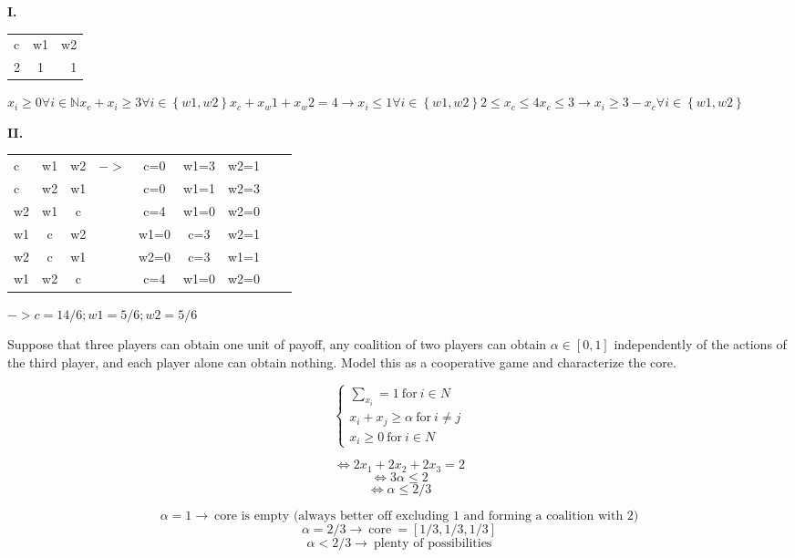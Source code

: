 \documentclass[../main.tex]{subfiles}
\begin{document}
\begin{solution}

\textbf{I.}

\begin{tabular}{ l | c |r }
  c & w1 & w2 \\
  2 & 1 & 1 \\
\end{tabular}

$x_i \geq 0 \forall i \in \mathbb{N}
x_c + x_i \geq 3 \forall i \in \left\{w1, w2\right\}
x_c + x_w1 + x_w2 = 4
\rightarrow
x_i \leq 1 \forall i \in \left\{w1,w2\right\}
2 \leq x_c \leq 4
x_c \leq 3 \rightarrow x_i \geq 3-x_c \forall i \in \left\{w1,w2\right\}$

\textbf{II.}

\begin{tabular}{ l c c c c c c c c }
  c & w1 & w2 & $->$ & c=0 & w1=3 & w2=1\\
  c & w2 & w1 &      & c=0 & w1=1 & w2=3\\
  w2 & w1 & c &      & c=4 & w1=0 & w2=0\\
  w1 & c & w2 &      & w1=0 & c=3 & w2=1\\
  w2 & c & w1 &      & w2=0 & c=3 & w1=1\\
  w1 & w2 & c &      & c=4 & w1=0 & w2=0\\
\end{tabular}

$-> c = 14/6; w1 = 5/6; w2 = 5/6$
\end{solution}

\begin{question}
Suppose that three players can obtain one unit of payoff, any coalition of two players can obtain $\alpha \in [0,1]$ independently of the actions of the third player, and each player alone can obtain nothing. Model this as a cooperative game and characterize the core.
\end{question}

\begin{solution}
\begin{equation}
 \begin{cases}
    \sum_{x_i} = 1 ~ \text{for} ~ i \in N\\
    x_i + x_j \geq \alpha ~ \text{for} ~ i \neq j\\
    x_i \geq 0 ~ \text{for} ~ i \in N
\end{cases}
\end{equation}

\[ \iff 2x_1 + 2x_2 + 2x_3 = 2 \]
\[ \iff 3\alpha \leq 2 \]
\[ \iff \alpha \leq 2/3 \]

\[ \alpha=1 \rightarrow ~ \text{core is empty (always better off excluding 1 and forming a coalition with 2)} \] 
\[ \alpha=2/3 \rightarrow ~ \text{core} ~ = [1/3, 1/3, 1/3] \]
\[ \alpha<2/3 \rightarrow ~ \text{plenty of possibilities} \]
\end{solution}
\end{document}
